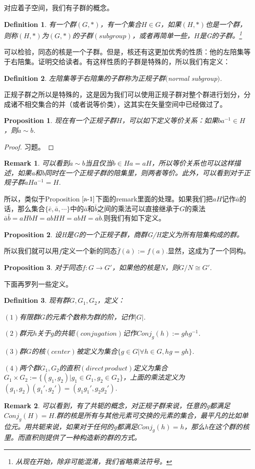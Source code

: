 \documentclass[11pt,a4paper,openany]{book}%
\theoremstyle{plain}%
\newtheorem{pro}{Proposition}[chapter]%
\newtheorem*{rem}{Remark}%
\newtheorem{defi}{Definition}[chapter]%
\newcommand{\NO}[1]{{$(#1)$}}%
\newcommand{\pref}[1]{{\rm Proposition} $\ref{#1}$}
\begin{document}
对应着子空间，我们有子群的概念。
\begin{defi}有一个群$(G,*)$，有一个集合$H\in G$，如果$(H,*)$也是一个群，则称$(H,*)$为$(G,*)$的子群$(subgroup)$，或者再简单一些，$H$是G的子群。\footnote{从现在开始，除非可能混淆，我们省略乘法符号。}
\end{defi}
可以检验，同态的核是一个子群。但是，核还有这更加优秀的性质：他的左陪集等于右陪集。证明交给读者。有这样性质的子群是特殊的，所以我们有定义：
\begin{defi}左陪集等于右陪集的子群称为正规子群$($normal subgroup$)$.
\end{defi}
正规子群之所以是特殊的，这是因为我们可以使用正规子群对整个群进行划分，分成诸不相交集合的并（或者说等价类），这其实在矢量空间中已经做过了。
\begin{pro}
现在有一个正规子群$H$，可以如下定义等价关系：如果$ba^{-1}\in H$，则$a\sim b$.
\end{pro}
\begin{proof}
习题。
\end{proof}
\begin{rem}
可以看到$a\sim b$当且仅当$b\in Ha=aH$，所以等价关系也可以这样描述，如果a和b同时在一个正规子群的陪集里，则两者等价。此外，可以看到对于正规子群$aHa^{-1}=H$.
\end{rem}
所以，类似于\pref{a-1}下面的remark里面的处理。如果我们把$aH$记作$\bar{a}$的话，那么集合$\{\bar{e},\bar{a},\cdots\}$中的$\bar{a}$和$\bar{b}$之间的乘法可以直接继承于$G$的乘法$\bar{a}\bar{b}=aHbH=abHH=abH=\overline{ab}$.则我们有如下定义。
\begin{pro}
设H是G的一个正规子群，商群G/H定义为所有陪集构成的群。
\end{pro}
所以我们就可以用$f$定义一个新的同态$\bar{f}(\bar{a}):=f(a)$.显然，这成为了一个同构。
\begin{pro}
对于同态$f:G\rightarrow G'$，如果他的核是N，则$G/N \cong G'$.
\end{pro}
下面再罗列一些定义。
\begin{defi}
现有群$G,G_1,G_2$，定义：

\NO{1}有限群$G$的元素个数称为群的阶，记作$|G|$.

\NO{2}群元$h$关于$g$的共轭$(conjugation)$记作$Conj_g(h):=ghg^{-1}$.

\NO{3}群$G$的核$(center)$被定义为集合$\{g\in G|\forall h\in G,hg=gh\}$.

\NO{4}两个群$G_1,G_2$的直积$(direct\,product)$定义为集合$G_1\times G_2:=\{(g_1,g_2)|g_1\in G_1,g_2\in G_2\}$，上面的乘法定义为$(g_1,g_2)(g_1',g_2')=(g_1g_1',g_2g_2')$.
\end{defi}
\begin{rem}
可以看到，有了共轭的概念，对正规子群来说，任意的g都满足$Conj_g(H)=H$.群的核是所有与其他元素可交换的元素的集合，最平凡的比如单位元。用共轭来说，如果对于任何的g都满足$Conj_g(h)=h$，那么h在这个群的核里。而直积则提供了一种构造新的群的方式。
\end{rem}
\end{document}
